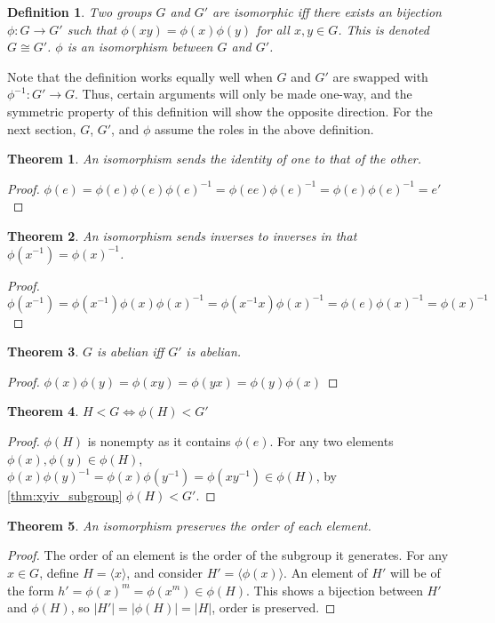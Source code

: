 \documentclass{article}
\newtheorem{theorem}{Theorem}[section]
\newtheorem{definition}{Definition}[section]
\begin{document}
\begin{definition}
    Two groups $G$ and $G'$ are \emph{isomorphic} iff there exists an bijection $\phi : G \to G'$
    such that $\phi(xy) = \phi(x)\phi(y)$ for all $x,y \in G$. This is denoted $G \cong G'$.
    $\phi$ is an \emph{isomorphism} between $G$ and $G'$.
\end{definition}

Note that the definition works equally well when $G$ and $G'$ are swapped with $\phi^{-1} : G' \to G$.
Thus, certain arguments will only be made one-way, and the symmetric property of this definition
will show the opposite direction. 
For the next section, $G$, $G'$, and $\phi$ assume the roles in the above definition.

\begin{theorem}
    An isomorphism sends the identity of one to that of the other.
\end{theorem}
\begin{proof}
    $\phi(e) = \phi(e)\phi(e)\phi(e)^{-1} = \phi(ee)\phi(e)^{-1} = \phi(e)\phi(e)^{-1} = e'$
\end{proof}

\begin{theorem}
    An isomorphism sends inverses to inverses in that $\phi(x^{-1}) = \phi(x)^{-1}$.
\end{theorem}
\begin{proof}
    $\phi(x^{-1}) = \phi(x^{-1})\phi(x)\phi(x)^{-1} = \phi(x^{-1}x)\phi(x)^{-1} = \phi(e)\phi(x)^{-1} = \phi(x)^{-1}$
\end{proof}

\begin{theorem}
    $G$ is abelian iff $G'$ is abelian.
\end{theorem}
\begin{proof}
    $\phi(x)\phi(y) = \phi(xy) = \phi(yx) = \phi(y)\phi(x)$
\end{proof}

\begin{theorem}
    $H < G \iff \phi(H) < G'$
\end{theorem}
\begin{proof}
    $\phi(H)$ is nonempty as it contains $\phi(e)$.
    For any two elements $\phi(x),\phi(y) \in \phi(H)$,
    $\phi(x)\phi(y)^{-1} = \phi(x)\phi(y^{-1}) = \phi(xy^{-1}) \in \phi(H)$,
    by \autoref{thm:xyiv_subgroup} $\phi(H) < G'$.
\end{proof}

\begin{theorem}
    An isomorphism preserves the order of each element.
\end{theorem}
\begin{proof}
    The order of an element is the order of the subgroup it generates.
    For any $x \in G$, define $H = \langle x\rangle$, and consider $H' = \langle\phi(x)\rangle$.
    An element of $H'$ will be of the form $h' = \phi(x)^{m} = \phi(x^{m}) \in \phi(H)$.
    This shows a bijection between $H'$ and $\phi(H)$, so $|H'| = |\phi(H)| = |H|$,
    order is preserved.
\end{proof}
\end{document}
